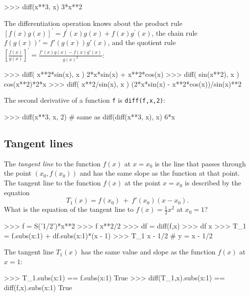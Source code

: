 \small
\begin{verbatimtab}
>>> diff(x**3, x)
3*x**2
\end{verbatimtab}
\normalsize

\noindent
The differentiation operation knows about the product rule $[f(x)g(x)]^\prime=f^\prime(x)g(x)+f(x)g^\prime(x)$, 
the chain rule $f(g(x))' = f'(g(x))g'(x)$, 
and the quotient rule $\left[\frac{f(x)}{g(x)}\right]^\prime = \frac{f'(x)g(x) - f(x)g'(x)}{g(x)^2}$:



\small
\begin{verbatimtab}
>>> diff( x**2*sin(x), x )
2*x*sin(x) + x**2*cos(x)
>>> diff( sin(x**2),   x )
cos(x**2)*2*x
>>> diff( x**2/sin(x), x )
(2*x*sin(x) - x**2*cos(x))/sin(x)**2
\end{verbatimtab}
\normalsize

\noindent
The second derivative of a function \texttt{f} is \texttt{diff(f,x,2)}:



\small
\begin{verbatimtab}
>>> diff(x**3, x, 2)       # same as diff(diff(x**3, x), x)
6*x
\end{verbatimtab}
\normalsize



\subsection{Tangent lines}
\label{calculus:tangent_lines}

The \emph{tangent line} to the function $f(x)$ at $x=x_0$ is 
the line that passes through the point $(x_0, f(x_0))$ and has 
the same slope as the function at that point.
The tangent line to the function $f(x)$ at the point $x=x_0$ is described by the equation
\[
   T_1(x) =  f(x_0) \ + \  f'(x_0)(x-x_0).
\]
What is the equation of the tangent line to $f(x)=\frac{1}{2}x^2$ at $x_0=1$?



\small
\begin{verbatimtab}
>>> f = S('1/2')*x**2
>>> f
x**2/2
>>> df = diff(f,x)
>>> df
x
>>> T_1 = f.subs({x:1}) + df.subs({x:1})*(x - 1)
>>> T_1
x - 1/2           #  y = x - 1/2
\end{verbatimtab}
\normalsize

\noindent
The tangent line $T_1(x)$ has the same value and slope as the function $f(x)$ at $x=1$:
\small
\begin{verbatimtab}
>>> T_1.subs({x:1}) == f.subs({x:1})
True
>>> diff(T_1,x).subs({x:1}) == diff(f,x).subs({x:1})
True
\end{verbatimtab}
\normalsize

